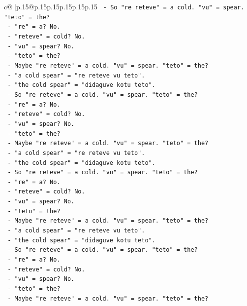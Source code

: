 \documentclass{article}
\begin{document}
{\begin{supertabular}{c@{$\;$}|p{.15\linewidth}@{}p{.15\linewidth}p{.15\linewidth}p{.15\linewidth}p{.15\linewidth}p{.15\linewidth}}
{{{\texttt{   {-} So "re reteve" = a cold. "vu" = spear. "teto" = the?} \\
\texttt{   {-} "re" = a? No.} \\
\texttt{   {-} "reteve" = cold? No.} \\
\texttt{   {-} "vu" = spear? No.} \\
\texttt{   {-} "teto" = the?} \\
\texttt{   {-} Maybe "re reteve" = a cold. "vu" = spear. "teto" = the?} \\
\texttt{   {-} "a cold spear" = "re reteve vu teto".} \\
\texttt{   {-} "the cold spear" = "didaguve kotu teto".} \\
\texttt{   {-} So "re reteve" = a cold. "vu" = spear. "teto" = the?} \\
\texttt{   {-} "re" = a? No.} \\
\texttt{   {-} "reteve" = cold? No.} \\
\texttt{   {-} "vu" = spear? No.} \\
\texttt{   {-} "teto" = the?} \\
\texttt{   {-} Maybe "re reteve" = a cold. "vu" = spear. "teto" = the?} \\
\texttt{   {-} "a cold spear" = "re reteve vu teto".} \\
\texttt{   {-} "the cold spear" = "didaguve kotu teto".} \\
\texttt{   {-} So "re reteve" = a cold. "vu" = spear. "teto" = the?} \\
\texttt{   {-} "re" = a? No.} \\
\texttt{   {-} "reteve" = cold? No.} \\
\texttt{   {-} "vu" = spear? No.} \\
\texttt{   {-} "teto" = the?} \\
\texttt{   {-} Maybe "re reteve" = a cold. "vu" = spear. "teto" = the?} \\
\texttt{   {-} "a cold spear" = "re reteve vu teto".} \\
\texttt{   {-} "the cold spear" = "didaguve kotu teto".} \\
\texttt{   {-} So "re reteve" = a cold. "vu" = spear. "teto" = the?} \\
\texttt{   {-} "re" = a? No.} \\
\texttt{   {-} "reteve" = cold? No.} \\
\texttt{   {-} "vu" = spear? No.} \\
\texttt{   {-} "teto" = the?} \\
\texttt{   {-} Maybe "re reteve" = a cold. "vu" = spear. "teto" = the?} \\
}}}
\end{supertabular}}
\end{document}
